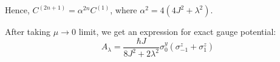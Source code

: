 \documentclass[11pt,a4paper]{article}
\begin{document}
Hence, $C^{(2n+1)}= \alpha^{2n} C^{(1)}$, where $\alpha^2= 4 (4 J^2 +  \lambda ^2) $. 


%
% 
%

After taking $\mu \rightarrow 0$ limit, we get an expression for exact gauge potential:
\begin{equation}
\boxed{ A_{\lambda} = \dfrac{\hbar J}{{8 J^2 + 2 \lambda ^2 }} \sigma_0^y ( \sigma_{-1}^z + \sigma_1^z)}
\end{equation}
\end{document}
